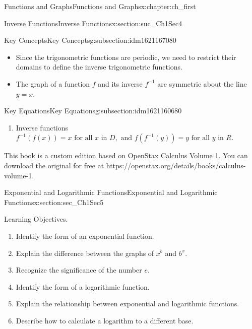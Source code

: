 \documentclass[oneside,10pt,]{book}
\numberwithin{equation}{section}
\begin{document}
\begin{chapterptx}{Functions and Graphs}{}{Functions and Graphs}{}{}{x:chapter:ch_first}
\begin{sectionptx}{Inverse Functions}{}{Inverse Functions}{}{}{x:section:suc_Ch1Sec4}
\begin{subsectionptx}{Key Concepts}{}{Key Concepts}{}{}{g:subsection:idm1621167080}
\begin{itemize}[label=\textbullet]
\item{}Since the trigonometric functions are periodic, we need to restrict their domains to define the inverse trigonometric functions.%
\item{}The graph of a function \(f\) and its inverse \(f^{-1} \) are symmetric about the line \(y=x.\)%
\end{itemize}
\end{subsectionptx}
%
%
\typeout{************************************************}
\typeout{************************************************}
%
\begin{subsectionptx}{Key Equations}{}{Key Equations}{}{}{g:subsection:idm1621160680}
%
\begin{enumerate}
\item{}Inverse functions \(f^{-1} (f(x))=x \text{ for all } x \text{ in } D,\text{ and } f(f^{-1} (y))=y \text{ for all } y \text{ in } R.\)%
\end{enumerate}
\end{subsectionptx}
This book is a custom edition based on OpenStax Calculus Volume 1. You can download the original for free at https:\slash{}\slash{}openstax.org\slash{}details\slash{}books\slash{}calculus-volume-1.%
\end{sectionptx}
%
%
\typeout{************************************************}
\typeout{************************************************}
%
\begin{sectionptx}{Exponential and Logarithmic Functions}{}{Exponential and Logarithmic Functions}{}{}{x:section:sec_Ch1Sec5}
\begin{introduction}{Learning Objectives.}%
%
\begin{enumerate}
\item{}Identify the form of an exponential function.%
\item{}Explain the difference between the graphs of \(x^b\) and \(b^x.\)%
\item{}Recognize the significance of the number \(e.\)%
\item{}Identify the form of a logarithmic function.%
\item{}Explain the relationship between exponential and logarithmic functions.%
\item{}Describe how to calculate a logarithm to a different base.%
\end{enumerate}

\end{introduction}
\end{sectionptx}
\end{chapterptx}
\end{document}
